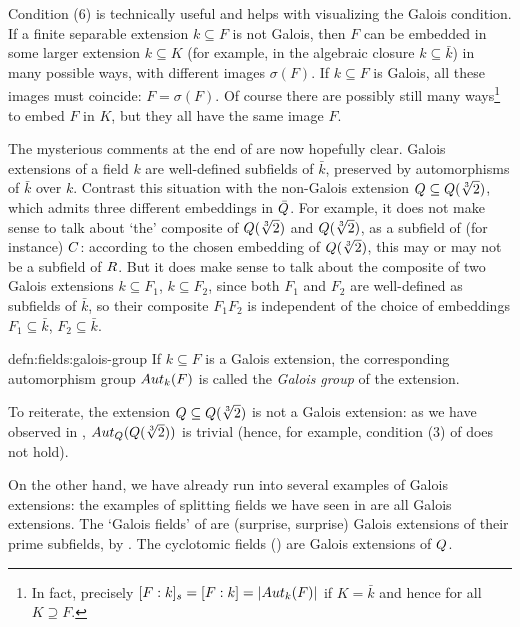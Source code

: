 Condition (6) is technically useful and helps with visualizing the
Galois condition. If a finite separable extension $k \subseteq F$ is
not Galois, then $F$ can be embedded in some larger extension
$k \subseteq K$ (for example, in the algebraic closure
$k \subseteq \bar{k}$) in many possible ways, with different images
$\sigma(F)$. If $k \subseteq F$ is Galois, all these images must
coincide: $F = \sigma(F)$. Of course there are possibly still many
ways\footnote{In fact, precisely $[F : k]_s = [F : k] = |Aut_k(F)|$
  if $K = \bar{k}$ and hence for all $K \supseteq F$.}  to embed $F$
in $K$, but they all have the same image $F$.

The mysterious comments at the end of  are
now hopefully clear.  Galois extensions of a field $k$ are
well-defined subfields of $\bar{k}$, preserved by automorphisms of
$\bar{k}$ over $k$. Contrast this situation with the non-Galois
extension $Q \subseteq Q(\sqrt[3]{2})$, which admits three different
embeddings in $\bar{Q}$. For example, it does not make sense to talk
about `the' composite of $Q(\sqrt[3]{2})$ and $Q(\sqrt[3]{2})$, as a
subfield of (for instance) $C$: according to the chosen embedding of
$Q(\sqrt[3]{2})$, this may or may not be a subfield of $R$. But it
does make sense to talk about the composite of two Galois extensions
$k \subseteq F_1$, $k \subseteq F_2$, since both $F_1$ and $F_2$ are
well-defined as subfields of $\bar{k}$, so their composite $F_1 F_2$
is independent of the choice of embeddings $F_1 \subseteq \bar{k}$,
$F_2 \subseteq \bar{k}$.
\begin{defn}{}{defn:fields:galois-group}
  If $k \subseteq F$ is a Galois extension, the corresponding
  automorphism group $Aut_k(F)$ is called the \emph{Galois group} of
  the extension.
\end{defn}
To reiterate, the extension $Q \subseteq Q(\sqrt[3]{2})$ is not a
Galois extension: as we have observed in ,
$Aut_{Q}(Q( \sqrt[3]{2}))$ is trivial (hence, for example,
condition (3) of  does not hold).

On the other hand, we have already run into several examples of Galois
extensions: the examples of splitting fields we have seen in
 are all
Galois extensions. The `Galois fields' of
 are (surprise, surprise) Galois
extensions of their prime subfields, by . The
cyclotomic fields
() are Galois
extensions of $Q$.


